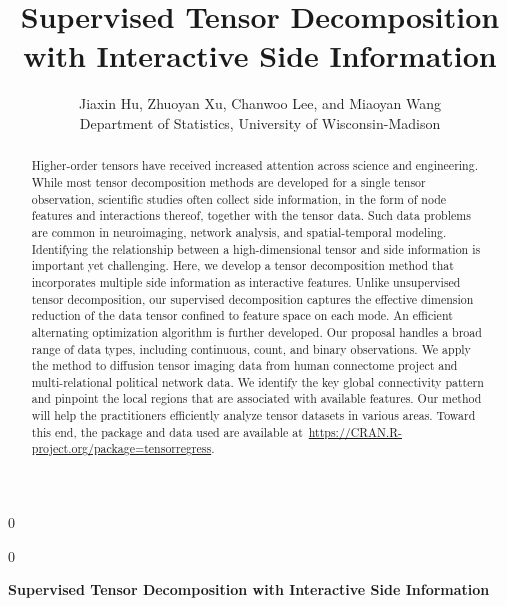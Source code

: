 \documentclass[12pt]{article}
\newcommand{\blind}{0}
\theoremstyle{definition}
\theoremstyle{definition}
\begin{document}
%

\def\spacingset#1{\renewcommand{\baselinestretch}%
{#1}\small\normalsize} \spacingset{1}




\blind
{
  \title{\bf Supervised Tensor Decomposition with Interactive Side Information}
  \author{Jiaxin Hu, Zhuoyan Xu, Chanwoo Lee, and Miaoyan Wang\\
    Department of Statistics, University of Wisconsin-Madison}
  \maketitle
} \fi

\blind
{
  \bigskip
  \bigskip
  \bigskip
  \begin{center}
    {\LARGE\bf Supervised Tensor Decomposition with Interactive Side Information}
\end{center}
  \medskip
} \fi



\bigskip
\begin{abstract}
Higher-order tensors have received increased attention across science and engineering. While most tensor decomposition methods are developed for a single tensor observation, scientific studies often collect side information, in the form of node features and interactions thereof, together with the tensor data. Such data problems are common in neuroimaging, network analysis, and spatial-temporal modeling. Identifying the relationship between a high-dimensional tensor and side information is important yet challenging. Here, we develop a tensor decomposition method that incorporates multiple side information as interactive features. Unlike unsupervised tensor decomposition, our supervised decomposition captures the effective dimension reduction of the data tensor confined to feature space on each mode. An efficient alternating optimization algorithm is further developed. Our proposal handles a broad range of data types, including continuous, count, and binary observations. We apply the method to diffusion tensor imaging data from human connectome project and multi-relational political network data. We identify the key global connectivity pattern and pinpoint the local regions that are associated with available features. Our method will help the practitioners efficiently analyze tensor datasets in various areas. Toward this end, the package and data used are available at~\url{https://CRAN.R-project.org/package=tensorregress}.

\end{abstract}
\end{document}

